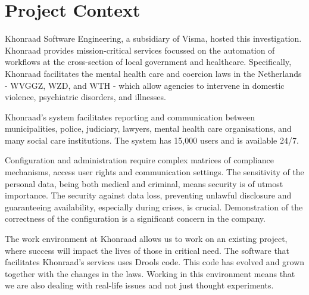 \section{Project Context}
\label{section:problem_context}

Khonraad Software Engineering, a subsidiary of Visma, hosted this investigation.
Khonraad provides mission-critical services focussed on the automation of workflows at the cross-section of local government and healthcare.
Specifically, Khonraad facilitates the mental health care and coercion laws in the Netherlands - WVGGZ, WZD, and WTH - which allow agencies to intervene in domestic violence, psychiatric disorders, and illnesses.

Khonraad's system facilitates reporting and communication between municipalities, police, judiciary, lawyers, mental health care organisations, and many social care institutions.
The system has 15,000 users and is available 24/7.

Configuration and administration require complex matrices of compliance mechanisms, access user rights and communication settings.
The sensitivity of the personal data, being both medical and criminal, means security is of utmost importance.
The security against data loss, preventing unlawful disclosure and guaranteeing availability, especially during crises, is crucial.
Demonstration of the correctness of the configuration is a significant concern in the company.

The work environment at Khonraad allows us to work on an existing project, where success will impact the lives of those in critical need. 
The software that facilitates Khonraad's services uses Drools code.
This code has evolved and grown together with the changes in the laws. 
Working in this environment means that we are also dealing with real-life issues and not just thought experiments.
